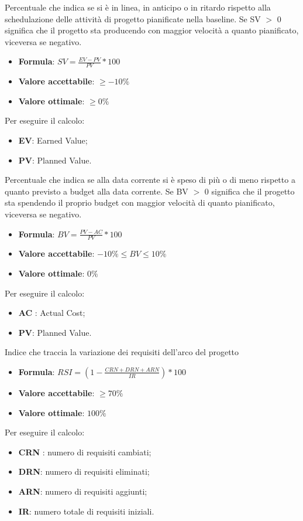 Percentuale che indica se si è in linea, in anticipo o in ritardo rispetto alla schedulazione delle attività di progetto pianificate nella baseline. 
Se SV $>$ 0 significa che il progetto sta producendo con maggior velocità a quanto pianificato, viceversa se negativo. 
\begin{itemize}
    \item \textbf{Formula}: $SV=\frac{EV-PV}{PV}*100$
    \item \textbf{Valore accettabile}: $\geq-10\%$
    \item \textbf{Valore ottimale}: $\geq0\%$
\end{itemize}  
Per eseguire il calcolo:
\begin{itemize}
    \item \textbf{EV}: Earned Value;
    \item \textbf{PV}: Planned Value.
\end{itemize}

Percentuale che indica se alla data corrente si è speso di più o di meno rispetto a quanto previsto a budget alla data corrente. 
Se BV $>$ 0 significa che il progetto sta spendendo il proprio budget con maggior velocità di quanto pianificato, viceversa se negativo.
\begin{itemize}
    \item \textbf{Formula}: $BV=\frac{PV-AC}{PV}*100$
    \item \textbf{Valore accettabile}: $-10\%\leq BV \leq 10\%$
    \item \textbf{Valore ottimale}: $0\%$
\end{itemize}  
Per eseguire il calcolo:
\begin{itemize}
    \item \textbf{AC} : Actual Cost;
    \item \textbf{PV}: Planned Value.
\end{itemize}

Indice che traccia la variazione dei requisiti dell'arco del progetto
\begin{itemize}
    \item \textbf{Formula}: $RSI = (1 - \frac{CRN+DRN+ARN}{IR})*100$
    \item \textbf{Valore accettabile}: $\geq70\%$
    \item \textbf{Valore ottimale}: $100\%$
\end{itemize}  
Per eseguire il calcolo:
\begin{itemize}
    \item \textbf{CRN} : numero di requisiti cambiati;
    \item \textbf{DRN}: numero di requisiti eliminati;
    \item \textbf{ARN}: numero di requisiti aggiunti;
    \item \textbf{IR}: numero totale di requisiti iniziali.
\end{itemize}

